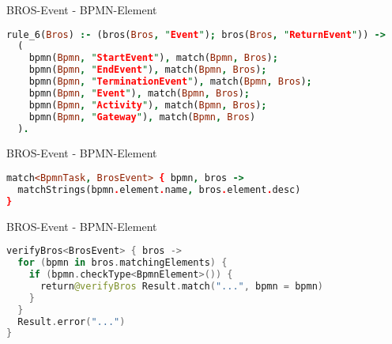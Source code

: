 \begin{frame}[fragile]{BROS-Event - BPMN-Element}
\begin{lstlisting}[language=Prolog]
rule_6(Bros) :- (bros(Bros, "Event"); bros(Bros, "ReturnEvent")) ->
  (
    bpmn(Bpmn, "StartEvent"), match(Bpmn, Bros);
    bpmn(Bpmn, "EndEvent"), match(Bpmn, Bros);
    bpmn(Bpmn, "TerminationEvent"), match(Bpmn, Bros);
    bpmn(Bpmn, "Event"), match(Bpmn, Bros);
    bpmn(Bpmn, "Activity"), match(Bpmn, Bros);
    bpmn(Bpmn, "Gateway"), match(Bpmn, Bros)
  ).
\end{lstlisting}
\end{frame}

\begin{frame}[fragile]{BROS-Event - BPMN-Element}
\begin{lstlisting}[language=Prolog]
match<BpmnTask, BrosEvent> { bpmn, bros ->
  matchStrings(bpmn.element.name, bros.element.desc)
}
\end{lstlisting}
\end{frame}

\begin{frame}[fragile]{BROS-Event - BPMN-Element}
\begin{lstlisting}[language=Kotlin]
verifyBros<BrosEvent> { bros ->
  for (bpmn in bros.matchingElements) {
    if (bpmn.checkType<BpmnElement>()) {
      return@verifyBros Result.match("...", bpmn = bpmn)
    }
  }
  Result.error("...")
}
\end{lstlisting}
\end{frame}